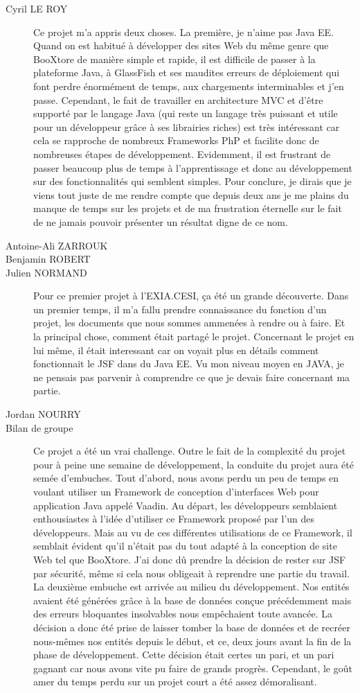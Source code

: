 \begin{description}
	\item[Cyril LE ROY]
	Ce projet m’a appris deux choses. 
	La première, je n’aime pas Java EE. Quand on est habitué à développer des sites Web du même genre que BooXtore de manière simple et rapide, il est difficile de passer à la plateforme Java, à GlassFish et ses maudites erreurs de déploiement qui font perdre énormément de temps, aux chargements interminables et j’en passe. 
	Cependant, le fait de travailler en architecture MVC et d’être supporté par le langage Java (qui reste un langage très puissant et utile pour un développeur grâce à ses librairies riches) est très intéressant car cela se rapproche de nombreux Frameworks PhP et facilite donc de nombreuses étapes de développement.
	Evidemment, il est frustrant de passer beaucoup plus de temps à l’apprentissage et donc au développement sur des fonctionnalités qui semblent simples. 
	Pour conclure, je dirais que je viens tout juste de me rendre compte que depuis deux ans je me plains du manque de temps sur les projets et de ma frustration éternelle sur le fait de ne jamais pouvoir présenter un résultat digne de ce nom.
	\item[Antoine-Ali ZARROUK]
	\item[Benjamin ROBERT]
	\item[Julien NORMAND]
	Pour ce premier projet à l'EXIA.CESI, ça été un grande découverte. Dans un premier temps, il m'a fallu prendre connaissance du fonction d'un projet, les documents que nous sommes ammenées à rendre ou à faire. Et la principal chose, comment était partagé le projet.
	Concernant le projet en lui même, il était interessant car on voyait plus en détails comment fonctionnait le JSF dans du Java EE. Vu mon niveau moyen en JAVA, je ne pensais pas parvenir à comprendre ce que je devais faire concernant ma partie. 
	\item[Jordan NOURRY]
	\item[Bilan de groupe]
	Ce projet a été un vrai challenge. Outre le fait de la complexité du projet pour à peine une semaine de développement, la conduite du projet aura été semée d’embuches. Tout d’abord, nous avons perdu un peu de temps en voulant utiliser un Framework de conception d’interfaces Web pour application Java appelé Vaadin. Au départ, les développeurs semblaient enthousiastes à l’idée d’utiliser ce Framework proposé par l’un des développeurs. Mais au vu de ces différentes utilisations de ce Framework, il semblait évident qu’il n’était pas du tout adapté à la conception de site Web tel que BooXtore. J’ai donc dû prendre la décision de rester sur JSF par sécurité, même si cela nous obligeait à reprendre une partie du travail. La deuxième embuche est arrivée au milieu du développement. Nos entités avaient été générées grâce à la base de données conçue précédemment mais des erreurs bloquantes insolvables nous empêchaient toute avancée. La décision a donc été prise de laisser tomber la base de données et de recréer nous-mêmes nos entités depuis le début, et ce, deux jours avant la fin de la phase de développement. Cette décision était certes un pari, et un pari gagnant car nous avons vite pu faire de grands progrès. Cependant, le goût amer du temps perdu sur un projet court a été assez démoralisant.

\end{description}
